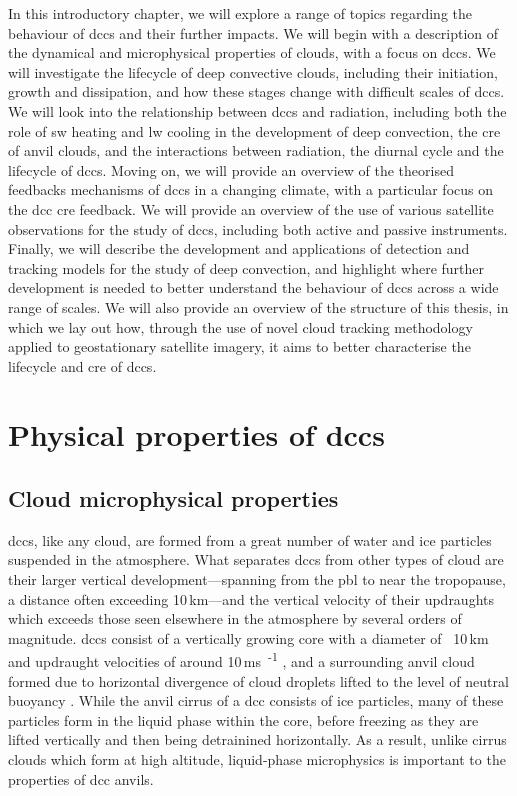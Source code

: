 In this introductory chapter, we will explore a range of topics regarding the behaviour of \acrshort{dcc}s and their further impacts.
We will begin with a description of the dynamical and microphysical properties of clouds, with a focus on \acrshort{dcc}s.
We will investigate the lifecycle of deep convective clouds, including their initiation, growth and dissipation, and how these stages change with difficult scales of \acrshort{dcc}s.
We will look into the relationship between \acrshort{dcc}s and radiation, including both the role of \acrshort{sw} heating and \acrshort{lw} cooling in the development of deep convection, the \acrshort{cre} of anvil clouds, and the interactions between radiation, the diurnal cycle and the lifecycle of \acrshort{dcc}s.
Moving on, we will provide an overview of the theorised feedbacks mechanisms of \acrshort{dcc}s in a changing climate, with a particular focus on the \acrshort{dcc} \acrshort{cre} feedback.
We will provide an overview of the use of various satellite observations for the study of \acrshort{dcc}s, including both active and passive instruments.
Finally, we will describe the development and applications of detection and tracking models for the study of deep convection, and highlight where further development is needed to better understand the behaviour of \acrshort{dcc}s across a wide range of scales.
We will also provide an overview of the structure of this thesis, in which we lay out how, through the use of novel cloud tracking methodology applied to geostationary satellite imagery, it aims to better characterise the lifecycle and \acrshort{cre} of \acrshort{dcc}s.


\section{Physical properties of \acrshort{dcc}s}

\subsection{Cloud microphysical properties}

\acrshort{dcc}s, like any cloud, are formed from a great number of water and ice particles suspended in the atmosphere.
What separates \acrshort{dcc}s from other types of cloud are their larger vertical development---spanning from the \acrshort{pbl} to near the tropopause, a distance often exceeding 10\,\unit{km}---and the vertical velocity of their updraughts which exceeds those seen elsewhere in the atmosphere by several orders of magnitude.
\acrshort{dcc}s consist of a vertically growing core with a diameter of ~10\,\unit{km} and updraught velocities of around 10\,\unit{ms\textsuperscript{-1}} \citep{weisman_mesoscale_2015}, and a surrounding anvil cloud formed due to horizontal divergence of cloud droplets lifted to the level of neutral buoyancy \citep{houze_chapter_2014}.
While the anvil cirrus of a \acrshort{dcc} consists of ice particles, many of these particles form in the liquid phase within the core, before freezing as they are lifted vertically and then being detrainined horizontally.
As a result, unlike cirrus clouds which form at high altitude, liquid-phase microphysics is important to the properties of \acrshort{dcc} anvils.

